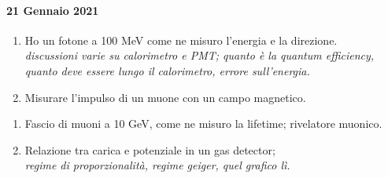 \documentclass[../main.tex]{subfiles}
\begin{document}
\paragraph{21 Gennaio 2021}
    \begin{enumerate}
        \item Ho un fotone a 100 MeV come ne misuro l'energia e la direzione.\\
        \textit{discussioni varie su calorimetro e PMT; quanto è la quantum efficiency, quanto deve essere lungo il calorimetro, errore sull'energia.}
        \item Misurare l'impulso di un muone con un campo magnetico. 
    \end{enumerate}
    \begin{enumerate}
        \item Fascio di muoni a 10 GeV, come ne misuro la lifetime; rivelatore muonico. 
        \item Relazione tra carica e potenziale in un gas detector;\\
        \textit{regime di proporzionalità, regime geiger, quel grafico lì.}
    \end{enumerate}
\end{document}
